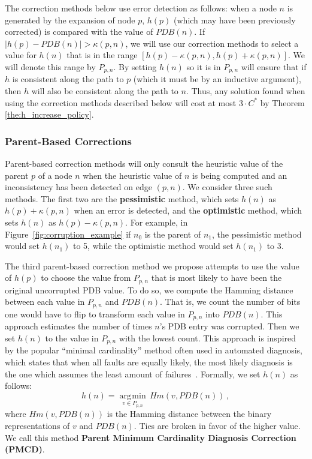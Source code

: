 \documentclass[letterpaper]{article}
\DeclareMathOperator*{\argmin}{\arg\!\min}
\begin{document}
The correction methods below use error detection as follows: when a node $n$ is generated by the expansion of node $p$, $h(p)$ (which may have been previously corrected) is compared with the value of $PDB(n)$.
If $|h(p) - PDB(n)| > \kappa(p, n)$, we will use our correction methods to select a value for $h(n)$ that is in the range $[h(p)-\kappa(p,n),h(p)+\kappa(p,n)]$.
We will denote this range by $P_{p,n}$.
By setting $h(n)$ so it is in $P_{p,n}$ will ensure that if $h$ is consistent along the path to $p$ (which it must be by an inductive argument), then $h$ will also be consistent along the path to $n$.
Thus, any solution found when using the correction methods described below will cost at most $3 \cdot C^*$  by Theorem \ref{the:h_increase_policy}.











\subsubsection{Parent-Based Corrections}
Parent-based correction methods will only consult the heuristic value of the parent $p$ of a node $n$ when the heuristic value of $n$ is being computed and an inconsistency has been detected on edge $(p,n)$. We consider three such methods. The first two are the \textbf{pessimistic} method, which sets $h(n)$ as $h(p) + \kappa(p, n)$ when an error is detected, and the \textbf{optimistic} method, which sets $h(n)$ as $h(p) - \kappa(p, n)$. For example, in Figure~\ref{fig:corruption_example} if $n_0$ is the parent of $n_1$, the pessimistic method would set $h(n_1)$ to 5, while the optimistic method would set $h(n_1)$ to 3.





The third parent-based correction method we propose attempts to use the value of $h(p)$ to choose the value from $P_{p,n}$ that is most likely to have been the original uncorrupted PDB value. To do so, we compute the Hamming distance between each value in $P_{p,n}$ and $PDB(n)$. That is, we count the number of bits one would have to flip to transform each value in $P_{p,n}$ into $PDB(n)$. %
This approach estimates the number of times $n$'s PDB entry was corrupted. Then we set $h(n)$ to the value in $P_{p,n}$ with the lowest count. This approach is inspired by the popular ``minimal cardinality'' method often used in automated diagnosis, which states that when all faults are equally likely, the most likely diagnosis is the one which assumes the least amount of failures~\cite{de1987diagnosing}.
Formally, we set $h(n)$ as follows:
\begin{equation}
h(n) = \underset{v \in P_{p,n}}{\argmin} \, Hm(v, PDB(n)) \,,
\end{equation}
\noindent
where $Hm(v, PDB(n))$ is the Hamming distance between the binary representations of $v$ and $PDB(n)$. Ties are broken in favor of the higher value.
We call this method \textbf{Parent Minimum Cardinality Diagnosis Correction (PMCD)}.
\end{document}
